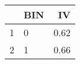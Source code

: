 \begin{table}[ht]
\centering
\begin{tabular}{rlr}
  \hline
 & BIN & IV \\ 
  \hline
1 & 0 & 0.62 \\ 
  2 & 1 & 0.66 \\ 
   \hline
\end{tabular}
\end{table}
